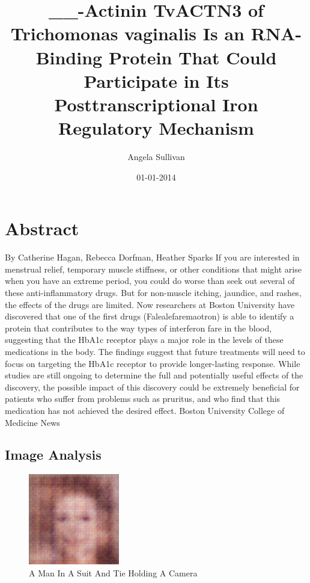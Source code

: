 \documentclass{article}%
\title{\_\_{-}Actinin TvACTN3 of Trichomonas vaginalis Is an RNA{-}Binding Protein That Could Participate in Its Posttranscriptional Iron Regulatory Mechanism}%
\author{Angela Sullivan}%
\affil{Department of Biochemistry, Osmania University, Hyderabad, A.P., India}%
\date{01{-}01{-}2014}%
\begin{document}
%
\normalsize%
\maketitle%
\section{Abstract}%
\label{sec:Abstract}%
By Catherine Hagan, Rebecca Dorfman, Heather Sparks\newline%
If you are interested in menstrual relief, temporary muscle stiffness, or other conditions that might arise when you have an extreme period, you could do worse than seek out several of these anti{-}inflammatory drugs. But for non{-}muscle itching, jaundice, and rashes, the effects of the drugs are limited. Now researchers at Boston University have discovered that one of the first drugs (Falealefaremaotron) is able to identify a protein that contributes to the way types of interferon fare in the blood, suggesting that the HbA1c receptor plays a major role in the levels of these medications in the body. The findings suggest that future treatments will need to focus on targeting the HbA1c receptor to provide longer{-}lasting response.\newline%
While studies are still ongoing to determine the full and potentially useful effects of the discovery, the possible impact of this discovery could be extremely beneficial for patients who suffer from problems such as pruritus, and who find that this medication has not achieved the desired effect.\newline%
Boston University College of Medicine News

%
\subsection{Image Analysis}%
\label{subsec:ImageAnalysis}%


\begin{figure}[h!]%
\centering%
\includegraphics[width=150px]{500_fake_images/samples_5_139.png}%
\caption{A Man In A Suit And Tie Holding A Camera}%
\end{figure}

%
\end{document}
